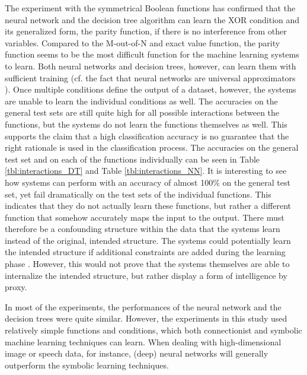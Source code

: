 \documentclass[letterpaper]{article} %
\begin{document}
The experiment with the symmetrical Boolean functions has confirmed that the neural network and the decision tree algorithm can learn the XOR condition and its generalized form, the parity function, if there is no interference from other variables. Compared to the M-out-of-N and exact value function, the parity function seems to be the most difficult function for the machine learning systems to learn. Both neural networks and decision trees, however, can learn them with sufficient training (cf. the fact that neural networks are universal approximators \cite{hornik1991approximation}). 
Once multiple conditions define the output of a dataset, however, the systems are unable to learn the individual conditions as well. The accuracies on the general test sets are still quite high for all possible interactions between the functions, but the systems do not learn the functions themselves as well. This supports the claim that a high classification accuracy is no guarantee that the right rationale is used in the classification process. The accuracies on the general test set and on each of the functions individually can be seen in Table \ref{tbl:interactions_DT} and Table \ref{tbl:interactions_NN}. It is interesting to see how systems can perform with an accuracy of almost 100\% on the general test set, yet fail dramatically on the test sets of the individual functions. This indicates that they do not actually learn these functions, but rather a different function that somehow accurately maps the input to the output. There must therefore be a confounding structure within the data that the systems learn instead of the original, intended structure. The systems could potentially learn the intended structure if additional constraints are added during the learning phase  \cite{schwab2012learn}. However, this would not prove that the systems themselves are able to internalize the intended structure, but rather display a form of intelligence by proxy.


In most of the experiments, the performances of the neural network and the decision trees were quite similar. %
However, the experiments in this study used relatively simple functions and conditions, which both connectionist and symbolic machine learning techniques can learn. When dealing with high-dimensional image or speech data, for instance, (deep) neural networks will generally outperform the symbolic learning techniques. %
\end{document}
